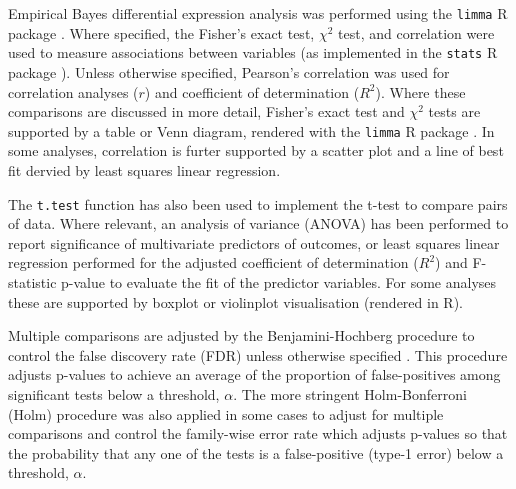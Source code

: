 Empirical Bayes differential expression analysis was performed using the \texttt{limma} R package \citep{limma}. Where specified, the Fisher's exact test, $\chi^2$ test, and correlation were used to measure associations between variables (as implemented in the \texttt{stats} R package \citep{R_core}). Unless otherwise specified, Pearson's correlation was used for correlation analyses ($r$) and coefficient of determination ($R^2$). Where these comparisons are discussed in more detail, Fisher's exact test and $\chi^2$ tests are supported by a table or Venn diagram, rendered with the \texttt{limma} R package \citep{limma}. In some analyses, correlation is furter supported by a scatter plot and a line of best fit dervied by least squares linear regression. 

The \texttt{t.test} function \citep{R_core} has also been used to implement the t-test to compare pairs of data. Where relevant, an analysis of variance (ANOVA) has been performed to report significance of multivariate predictors of outcomes, or least squares linear regression performed for the adjusted coefficient of determination ($R^2$) and F-statistic p-value to evaluate the fit of the predictor variables. For some analyses these are supported by boxplot or violinplot visualisation (rendered in R).

Multiple comparisons are adjusted by the Benjamini-Hochberg procedure to control the false discovery rate (FDR) unless otherwise specified \citep{fdr1995}. This procedure adjusts p-values to achieve an average of the proportion of false-positives among significant tests below a threshold, $\alpha$. The more stringent Holm-Bonferroni (Holm) procedure \citep{Holm1979} was also applied in some cases to adjust for multiple comparisons and control the family-wise error rate which adjusts p-values so that the probability that any one of the tests is a false-positive (type-1 error) below a threshold, $\alpha$.

